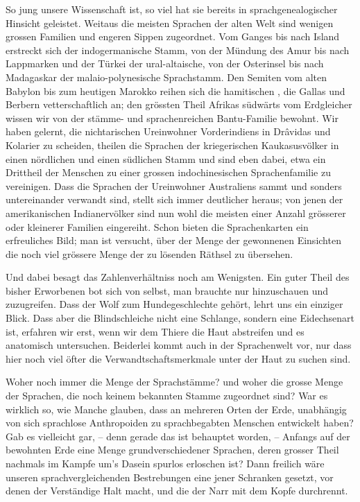 So jung unsere Wissenschaft ist, so viel hat sie bereits in sprachgenealogischer Hinsicht geleistet. Weitaus die meisten Sprachen der alten Welt sind wenigen grossen Familien und engeren Sippen zugeordnet. Vom Ganges bis nach Island erstreckt sich der indogermanische Stamm, von der Mündung des Amur bis nach Lappmarken und der Türkei der ural-altaische, von der Osterinsel bis nach Madagaskar der malaio-polynesische Sprachstamm. Den Semiten vom alten Babylon bis zum heutigen Marokko reihen sich die hamitischen , die Gallas \label{fp.151} und Berbern vetterschaftlich an; den grössten Theil Afrikas südwärts vom Erdgleicher wissen wir von der stämme- und sprachenreichen Bantu-Familie bewohnt. Wir haben gelernt, die nichtarischen Ureinwohner Vorderindiens in Drâvidas und Kolarier zu scheiden, theilen die Sprachen der kriegerischen Kaukasusvölker in einen nördlichen und einen südlichen Stamm und sind eben dabei, etwa ein Drittheil der Menschen zu einer grossen indochinesischen Sprachenfamilie zu vereinigen. Dass die Sprachen der Ureinwohner Australiens sammt und sonders untereinander verwandt sind, stellt sich immer deutlicher heraus; von jenen der amerikanischen Indianervölker sind nun wohl die meisten einer Anzahl grösserer oder kleinerer Familien eingereiht. Schon bieten die Sprachenkarten ein erfreuliches Bild; man ist versucht, über der \label{sp.143} Menge der gewonnenen Einsichten die noch viel grössere Menge der zu lösenden Räthsel zu übersehen.

Und dabei besagt das Zahlenverhältniss noch am Wenigsten. Ein guter Theil des bisher Erworbenen bot sich von selbst, man brauchte nur hinzuschauen und zuzugreifen. Dass der Wolf zum Hundegeschlechte gehört, lehrt uns ein einziger Blick. Dass aber die Blindschleiche nicht eine Schlange, sondern eine Eidechsenart ist, erfahren wir erst, wenn wir dem Thiere die Haut abstreifen und es anatomisch untersuchen. Beiderlei kommt auch in der Sprachenwelt vor, nur dass hier noch viel öfter die Verwandtschaftsmerkmale unter der Haut zu suchen sind.

Woher noch immer die Menge der Sprachstämme? und woher die grosse Menge der Sprachen, die noch keinem bekannten Stamme zugeordnet sind? War es wirklich so, wie Manche glauben, dass an mehreren Orten der Erde, unabhängig von  sich sprachlose Anthropoiden zu sprachbegabten Menschen entwickelt haben? Gab es vielleicht gar, – denn gerade das ist behauptet worden, – Anfangs auf der bewohnten Erde eine Menge grundverschiedener Sprachen, deren grosser Theil nachmals im Kampfe um’s Dasein spurlos erloschen ist? Dann freilich wäre unseren sprachvergleichenden Bestrebungen eine jener Schranken gesetzt, vor denen der Verständige Halt macht, und die der Narr mit dem Kopfe durchrennt.

